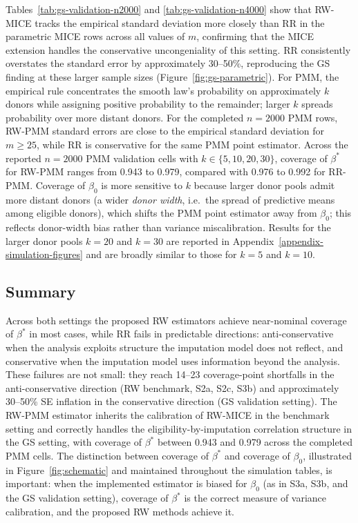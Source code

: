 \FloatBarrier
Tables~\ref{tab:gs-validation-n2000} and
\ref{tab:gs-validation-n4000} show that RW-MICE tracks the empirical
standard deviation more closely than RR in the parametric
MICE rows across all values of \(m\), confirming that the MICE
extension handles the conservative uncongeniality of this setting.
RR consistently overstates the standard error by
approximately 30--50\%, reproducing the GS finding at these larger
sample sizes (Figure~\ref{fig:gs-parametric}).
For PMM, the empirical rule concentrates the smooth law's probability
on approximately \(k\) donors while assigning positive probability to
the remainder; larger \(k\) spreads probability over more distant
donors. For the completed \(n=2000\) PMM rows,
RW-PMM standard errors are close to the empirical standard
deviation for \(m\ge 25\), while RR is conservative for
the same PMM point estimator.
Across the reported \(n=2000\) PMM validation cells with
\(k\in\{5,10,20,30\}\), coverage of \(\beta^\ast\) for RW-PMM ranges
from 0.943 to 0.979, compared with 0.976 to 0.992 for RR-PMM.  Coverage
of \(\beta_0\) is more sensitive to \(k\) because larger donor pools
admit more distant donors (a wider \emph{donor width}, i.e.\ the spread
of predictive means among eligible donors), which shifts the PMM point
estimator away from \(\beta_0\); this reflects donor-width bias rather
than variance miscalibration.  Results for the larger donor pools
\(k=20\) and \(k=30\) are reported in
Appendix~\ref{appendix-simulation-figures} and are broadly similar to
those for \(k=5\) and \(k=10\).
\subsection{Summary}
Across both settings the proposed RW estimators achieve near-nominal
coverage of \(\beta^\ast\) in most cases, while RR fails in
predictable directions: anti-conservative when the analysis exploits
structure the imputation model does not reflect, and conservative when
the imputation model uses information beyond the analysis. These failures are not
small: they reach 14--23 coverage-point shortfalls in the
anti-conservative direction (RW benchmark, S2a, S2c, S3b) and
approximately 30--50\% SE inflation in the conservative direction (GS
validation setting). The RW-PMM estimator inherits the
calibration of RW-MICE in the benchmark setting and correctly handles
the eligibility-by-imputation correlation structure in the GS setting,
with coverage of \(\beta^\ast\) between 0.943 and 0.979 across the
completed PMM cells. The distinction between coverage of \(\beta^\ast\)
and coverage of \(\beta_0\), illustrated in
Figure~\ref{fig:schematic} and maintained throughout the simulation
tables, is important: when the implemented estimator is biased for
\(\beta_0\) (as in S3a, S3b, and the GS validation setting), coverage
of \(\beta^\ast\) is the correct measure of variance calibration, and
the proposed RW methods achieve it.

